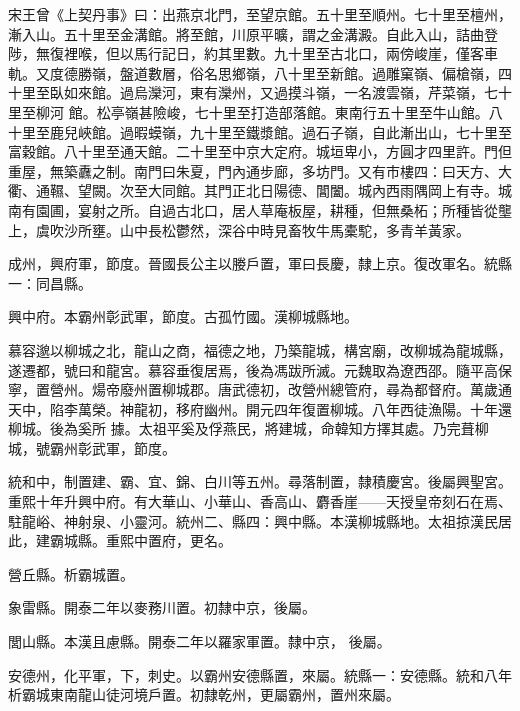 \begin{pinyinscope}
 宋王曾《上契丹事》曰：出燕京北門，至望京館。五十里至順州。七十里至檀州，漸入山。五十里至金溝館。將至館，川原平曠，謂之金溝澱。自此入山，詰曲登陟，無復裡喉，但以馬行記日，約其里數。九十里至古北口，兩傍峻崖，僅客車軌。又度德勝嶺，盤道數層，俗名思鄉嶺，八十里至新館。過雕窠嶺、偏槍嶺，四十里至臥如來館。過烏灤河，東有灤州，又過摸斗嶺，一名渡雲嶺，芹菜嶺，七十里至柳河
 館。松亭嶺甚險峻，七十里至打造部落館。東南行五十里至牛山館。八十里至鹿兒峽館。過暇蟆嶺，九十里至鐵漿館。過石子嶺，自此漸出山，七十里至富穀館。八十里至通天館。二十里至中京大定府。城垣卑小，方圓才四里許。門但重屋，無築纛之制。南門曰朱夏，門內通步廊，多坊門。又有市樓四：曰天方、大衢、通韅、望闕。次至大同館。其門正北日陽德、閶闔。城內西雨隅岡上有寺。城南有園圃，宴射之所。自過古北口，居人草庵板屋，耕種，但無桑柘；所種皆從壟上，虞吹沙所壅。山中長松鬱然，深谷中時見畜牧牛馬橐駝，多青羊黃家。



 成州，興府軍，節度。晉國長公主以媵戶置，軍曰長慶，隸上京。復改軍名。統縣一：同昌縣。



 興中府。本霸州彰武軍，節度。古孤竹國。漢柳城縣地。



 慕容邈以柳城之北，龍山之商，福德之地，乃築龍城，構宮廟，改柳城為龍城縣，遂遷都，號曰和龍宮。慕容垂復居焉，後為馮跋所滅。元魏取為遼西邵。隨平高保寧，置營州。煬帝廢州置柳城郡。唐武德初，改營州總管府，尋為都督府。萬歲通天中，陷李萬榮。神龍初，移府幽州。開元四年復置柳城。八年西徒漁陽。十年還柳城。後為奚所
 據。太祖平奚及俘燕民，將建城，命韓知方擇其處。乃完葺柳城，號霸州彰武軍，節度。



 統和中，制置建、霸、宜、錦、白川等五州。尋落制置，隸積慶宮。後屬興聖宮。重熙十年升興中府。有大華山、小華山、香高山、麝香崖——天授皇帝刻石在焉、駐龍峪、神射泉、小靈河。統州二、縣四：興中縣。本漢柳城縣地。太祖掠漢民居此，建霸城縣。重熙中置府，更名。



 營丘縣。析霸城置。



 象雷縣。開泰二年以麥務川置。初隸中京，後屬。



 閭山縣。本漢且慮縣。開泰二年以羅家軍置。隸中京，
 後屬。



 安德州，化平軍，下，刺史。以霸州安德縣置，來屬。統縣一：安德縣。統和八年析霸城東南龍山徒河境戶置。初隸乾州，更屬霸州，置州來屬。




\end{pinyinscope}
